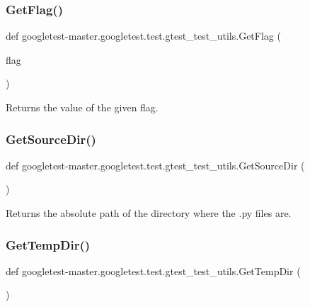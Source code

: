 \subsubsection{\texorpdfstring{GetFlag()}{GetFlag()}}
{\footnotesize\ttfamily def googletest-\/master.\+googletest.\+test.\+gtest\+\_\+test\+\_\+utils.\+Get\+Flag (\begin{DoxyParamCaption}\item[{}]{flag }\end{DoxyParamCaption})}

\begin{DoxyVerb}Returns the value of the given flag.\end{DoxyVerb}
 \mbox{\label{namespacegoogletest-master_1_1googletest_1_1test_1_1gtest__test__utils_a5b2487a7b4864fb1c1fd6d5c283062ef}} 
\subsubsection{\texorpdfstring{GetSourceDir()}{GetSourceDir()}}
{\footnotesize\ttfamily def googletest-\/master.\+googletest.\+test.\+gtest\+\_\+test\+\_\+utils.\+Get\+Source\+Dir (\begin{DoxyParamCaption}{ }\end{DoxyParamCaption})}

\begin{DoxyVerb}Returns the absolute path of the directory where the .py files are.\end{DoxyVerb}
 \mbox{\label{namespacegoogletest-master_1_1googletest_1_1test_1_1gtest__test__utils_a2710dd8832dbb21fab8283e6b997f63c}} 
\subsubsection{\texorpdfstring{GetTempDir()}{GetTempDir()}}
{\footnotesize\ttfamily def googletest-\/master.\+googletest.\+test.\+gtest\+\_\+test\+\_\+utils.\+Get\+Temp\+Dir (\begin{DoxyParamCaption}{ }\end{DoxyParamCaption})}


